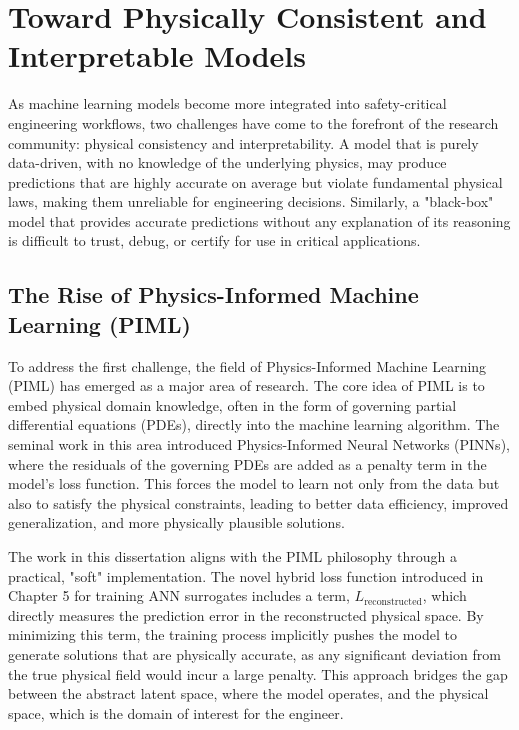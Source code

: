 \documentclass[dsc, EN]{ufabcFHZh}
\begin{document}
{\section{Toward Physically Consistent and Interpretable Models}

As machine learning models become more integrated into safety-critical engineering workflows, two challenges have come to the forefront of the research community: physical consistency and interpretability. A model that is purely data-driven, with no knowledge of the underlying physics, may produce predictions that are highly accurate on average but violate fundamental physical laws, making them unreliable for engineering decisions. Similarly, a "black-box" model that provides accurate predictions without any explanation of its reasoning is difficult to trust, debug, or certify for use in critical applications.


\subsection{The Rise of Physics-Informed Machine Learning (PIML)}


To address the first challenge, the field of Physics-Informed Machine Learning (PIML) has emerged as a major area of research. The core idea of PIML is to embed physical domain knowledge, often in the form of governing partial differential equations (PDEs), directly into the machine learning algorithm. The seminal work in this area introduced Physics-Informed Neural Networks (PINNs), where the residuals of the governing PDEs are added as a penalty term in the model's loss function. This forces the model to learn not only from the data but also to satisfy the physical constraints, leading to better data efficiency, improved generalization, and more physically plausible solutions.


The work in this dissertation aligns with the PIML philosophy through a practical, "soft" implementation. The novel hybrid loss function introduced in Chapter 5 for training ANN surrogates includes a term, $L_{\text{reconstructed}}$, which directly measures the prediction error in the reconstructed physical space. By minimizing this term, the training process implicitly pushes the model to generate solutions that are physically accurate, as any significant deviation from the true physical field would incur a large penalty. This approach bridges the gap between the abstract latent space, where the model operates, and the physical space, which is the domain of interest for the engineer.


}
\end{document}

